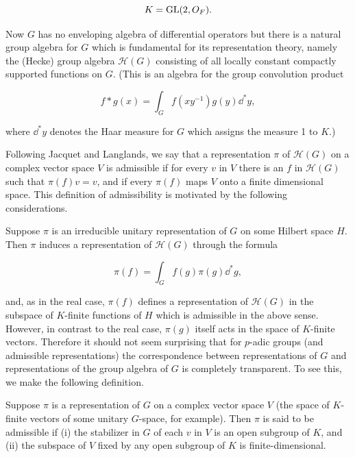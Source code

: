 \[
K = \operatorname{GL}(2, O_F).
\]

Now $G$ has no enveloping algebra of differential operators but there is a natural group algebra for $G$ which is fundamental for its representation theory, namely the (Hecke) group algebra $\mathcal{H}(G)$ consisting of all locally constant compactly supported functions on $G$. (This is an algebra for the group convolution product

\[
f * g(x) = \int_G f(xy^{-1})g(y)\dd^{*}y,
\]

where $\dd^{*}y$ denotes the Haar measure for $G$ which assigns the measure 1 to $K$.)

Following Jacquet and Langlands, we say that a representation $\pi$ of $\mathcal{H}(G)$ on a complex vector space $V$ is admissible if for every $v$ in $V$ there is an $f$ in $\mathcal{H}(G)$ such that $\pi(f)v = v$, and if every $\pi(f)$ maps $V$ onto a finite dimensional space. This definition of admissibility is motivated by the following considerations.

Suppose $\pi$ is an irreducible unitary representation of $G$ on some Hilbert space $H$. Then $\pi$ induces a representation of $\mathcal{H}(G)$ through the formula

\[
\pi(f) = \int_G f(g)\pi(g)\dd^{*}g,
\]

and, as in the real case, $\pi(f)$ defines a representation of $\mathcal{H}(G)$ in the subspace of $K$-finite functions of $H$ which is admissible in the above sense. However, in contrast to the real case, $\pi(g)$ itself acts in the space of $K$-finite vectors. Therefore it should not seem surprising that for $p$-adic groups (and admissible representations) the correspondence between representations of $G$ and representations of the group algebra of $G$ is completely transparent. To see this, we make the following definition.

\begin{definition}\label{def:4.9}

Suppose $\pi$ is a representation of $G$ on a complex vector space $V$ (the space of $K$-finite vectors of some unitary $G$-space, for example). Then $\pi$ is said to be admissible if (i) the stabilizer in $G$ of each $v$ in $V$ is an open subgroup of $K$, and (ii) the subspace of $V$ fixed by any open subgroup of $K$ is finite-dimensional.

\end{definition}

